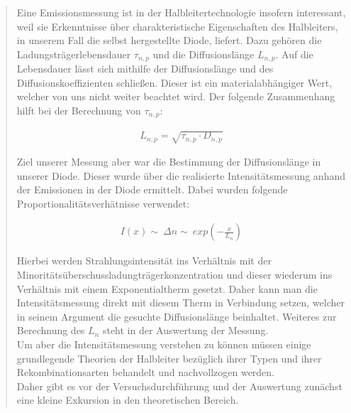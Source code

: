 \begin{quote}
    
    Eine Emissionsmessung ist in der Halbleitertechnologie insofern interessant,
    weil sie Erkenntnisse über charakteristische Eigenschaften des Halbleiters,
    in unserem Fall die selbst hergestellte Diode, liefert. Dazu gehören die
    Ladungsträgerlebensdauer $\tau_{n,p}$ und die Diffusionslänge $L_{n,p}$. Auf
    die Lebensdauer lässt sich mithilfe der Diffusionslänge und des
    Diffusionskoeffizienten schließen. Dieser ist ein materialabhängiger Wert,
    welcher von uns nicht weiter beachtet wird. Der folgende Zusammenhang hilft
    bei der Berechnung von $\tau_{n,p}$:
    
    \begin{equation*}
        \begin{split}
            L_{n,p} = \sqrt{\tau_{n,p} \cdot D_{n,p}} 
        \end{split}
    \end{equation*}
    
    Ziel unserer Messung aber war die Bestimmung der Diffusionslänge in unserer
    Diode. Dieser wurde über die realisierte Intensitätsmessung anhand der
    Emissionen in der Diode ermittelt. Dabei wurden folgende
    Proportionalitätsverhätnisse verwendet:
    
    \begin{equation*}
        \begin{split}
            I(x) \sim \ \Delta n \sim \ exp(-\frac{x}{L_n}) 
        \end{split}
    \end{equation*}
    
    Hierbei werden Strahlungsintensität ins Verhältnis mit der\\
    Minoritätsüberschussladungträgerkonzentration und dieser wiederum 
    ins Verhältnis mit einem Exponentialtherm gesetzt. Daher kann man die
    Intensitätsmessung direkt mit diesem Therm in Verbindung setzen, 
    welcher in seinem Argument die gesuchte Diffusionslänge beinhaltet. Weiteres
    zur Berechnung des $L_n$ steht in der Auswertung der Messung.\\
    
    Um aber die Intensitätsmessung verstehen zu können müssen einige
    grundlegende Theorien der Halbleiter bezüglich ihrer Typen und ihrer
    Rekombinationsarten behandelt und nachvollzogen werden.\\ 
    Daher gibt es vor der Versuchsdurchführung und der Auswertung zunächst eine
    kleine Exkursion in den theoretischen Bereich.
    

\end{quote}
